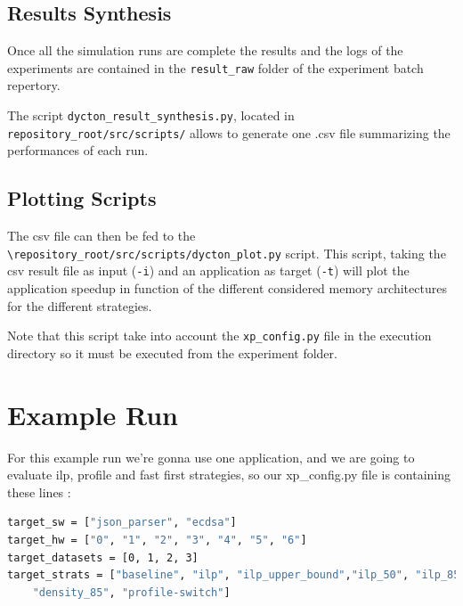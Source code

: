 \documentclass[10 pt]{article}
\begin{document}
\subsection{Results Synthesis}
Once all the simulation runs are complete the results and the logs of the experiments are contained in the \lstinline{result_raw} folder of the experiment batch repertory.

The script \lstinline{dycton_result_synthesis.py}, located in \lstinline{repository_root/src/scripts/} allows to generate one .csv file summarizing the performances of each run.


\subsection{Plotting Scripts}
The csv file can then be fed to the \lstinline{\repository_root/src/scripts/dycton_plot.py} script.
This script, taking the csv result file as input (\lstinline{-i}) and an application as target (\lstinline{-t}) will plot the application speedup in function of the different considered memory architectures for the different strategies.

Note that this script take into account the \lstinline{xp_config.py} file in the execution directory so it must be executed from the experiment folder.


\section{Example Run}
For this example run we're gonna use one application, and we are going to evaluate ilp, profile and fast first strategies, so our xp\_config.py file is containing these lines :
\begin{lstlisting}[language=bash]
target_sw = ["json_parser", "ecdsa"]
target_hw = ["0", "1", "2", "3", "4", "5", "6"]
target_datasets = [0, 1, 2, 3]
target_strats = ["baseline", "ilp", "ilp_upper_bound","ilp_50", "ilp_85", "density", "density_50",
    "density_85", "profile-switch"]
\end{lstlisting}
\end{document}
